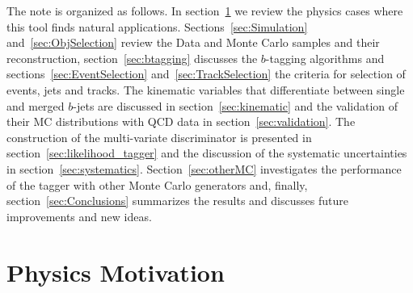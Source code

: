 The note is organized as follows. In section~\ref{sec:motivation} we review the physics cases where this tool finds natural applications. Sections~\ref{sec:Simulation} and~\ref{sec:ObjSelection} review the Data and Monte Carlo samples and their reconstruction, section~\ref{sec:btagging} discusses the $b$-tagging algorithms and sections~\ref{sec:EventSelection} and~\ref{sec:TrackSelection} the criteria for selection of events, jets and tracks. The kinematic variables that differentiate between single and merged $b$-jets are discussed in section~\ref{sec:kinematic} and the validation of their MC distributions with QCD data in section~\ref{sec:validation}.  The construction of the multi-variate discriminator is presented in section~\ref{sec:likelihood_tagger} and the discussion of the systematic uncertainties in section~\ref{sec:systematics}. Section~\ref{sec:otherMC} investigates the performance of the tagger with other Monte Carlo generators and, finally, section~\ref{sec:Conclusions} summarizes the results and discusses future improvements and new ideas. %

\section{Physics Motivation}\label{sec:motivation}


